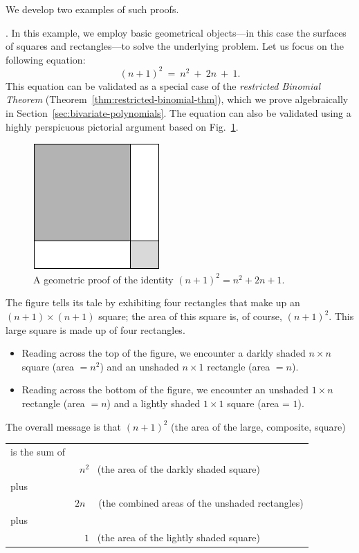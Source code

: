 We develop two examples of such proofs.

\medskip

.
In this example, we employ basic geometrical objects---in this case the surfaces of squares and rectangles---to solve the underlying problem.  Let us focus on the following equation:
\begin{equation}
(n+1)^2 \ = \ n^2 \ + \ 2n \ + \ 1.
\end{equation}
This equation can be validated as a special case of the {\em restricted Binomial Theorem}
(Theorem~\ref{thm:restricted-binomial-thm}), which we prove algebraically in Section~\ref{sec:bivariate-polynomials}.  The equation can also be validated using a highly perspicuous pictorial argument based on Fig.~\ref{fig:proofa2plusb2}.
\begin{figure}[ht]
\begin{center}
       \includegraphics[scale=0.4]{FiguresMaths/proofa2plusb2}
\caption{A geometric proof of the identity $(n+1)^2 = n^2 + 2n + 1$.}
       \label{fig:proofa2plusb2}
\end{center}
\end{figure}
The figure tells its tale by exhibiting four rectangles that make up an $(n+1) \times (n+1)$ square; the area of this square is, of course, $(n+1)^2$.  This large square is made up of four rectangles.
\begin{itemize}
\item
Reading across the top of the figure, we encounter a darkly shaded $n \times n$ square (area $= n^2$) and an unshaded $n \times 1$ rectangle (area $= n$).
\item
Reading across the bottom of the figure, we encounter an unshaded $1 \times n$ rectangle (area $= n$) and a lightly shaded $1 \times 1$ square (area = $1$).
\end{itemize}
The overall message is that $(n+1)^2$ (the area of the large, composite, square)

\begin{tabular}{ll}
is the sum of & \\
  & \ $n^2$ \ (the area of the darkly shaded square) \\
plus & \\
  & $2n$ \ \ (the combined areas of the unshaded rectangles) \\
plus & \\
  & \ \ $1$ \ (the area of the lightly shaded square)
\end{tabular}

